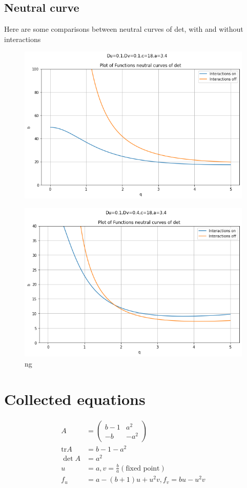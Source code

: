 \documentclass{article}
\newcommand{\tr}{\text{tr}}
\begin{document}
\subsection{Neutral curve}
Here are some comparisons between neutral curves of det, with and without interactions
\begin{figure}[H]
\includegraphics[width=\textwidth]{images/plot_20240719_111506.png} 

\end{figure}
\begin{figure}[H]
\includegraphics[width=\textwidth]{images/plot_20240719_112606.png} ng

\end{figure}
\section{Collected equations}
\begin{align}
A&=\begin{pmatrix}b-1& a^2 \\ -b &-a^2\end{pmatrix}\\
\tr A &= b-1-a^2\\
\det A&= a^2\\
u&=a,v=\frac{b}{a} (\text{fixed point})\\
f_u &= a-(b+1)u+u^2v, f_v = bu-u^2v
\end{align}
\end{document}
